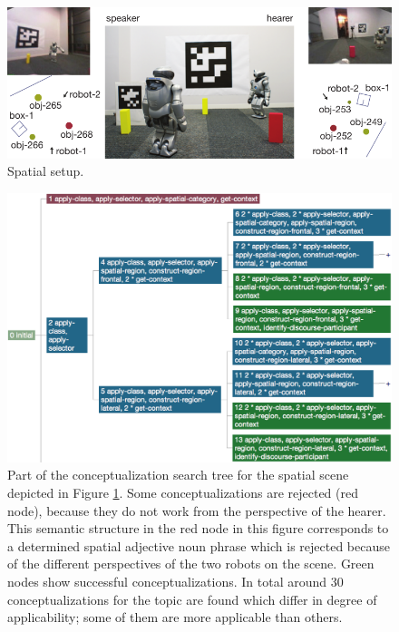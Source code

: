 \begin{figure}
\begin{centering}
\includegraphics[width=1\columnwidth]{figs/space-scene-2-small}
\end{centering}
\caption[Spatial setup example.]
{Spatial setup.}
\label{f:space-scene-2}
\end{figure}

\begin{figure}
\begin{centering}
\includegraphics[width=1\columnwidth]{figs/conceptualization.png}
\end{centering}
\caption[Example search tree for conceptualization of a spatial scene.]
{Part of the conceptualization search tree for the spatial scene depicted
in Figure \ref{f:space-scene-2}.
Some conceptualizations are rejected (red node), because they do not work
from the perspective of the hearer. This semantic structure in the red node 
in this figure corresponds to a determined spatial adjective noun phrase 
which is rejected because of the different
perspectives of the two robots on the scene. Green nodes 
show successful conceptualizations. In total around 30 conceptualizations 
for the topic are found which differ in degree of
applicability; some of them are more applicable than others.}
\label{f:conceptualization-search}
\end{figure}

